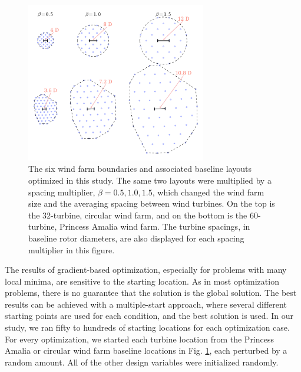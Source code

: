 \begin{figure}[htbp]
  \centering
  \includegraphics[width=0.7\textwidth]{Figures/spacing_multipliers.pdf}
  \caption{\label{farm_spacings}The six wind farm boundaries and associated baseline layouts optimized in this study. The same two layouts were multiplied by a spacing multiplier, $\beta=0.5,1.0,1.5$, which changed the wind farm size and the averaging spacing between wind turbines.  On the top is the 32-turbine, circular wind farm, and on the bottom is the 60-turbine, Princess Amalia wind farm. The turbine spacings, in baseline rotor diameters, are also displayed for each spacing multiplier in this figure.}
\end{figure}

The results of gradient-based optimization, especially for problems with many local minima, are sensitive to the starting location. As in most optimization problems, there is no guarantee that the solution is the global solution. The best results can be achieved with a multiple-start approach, where several different starting points are used for each condition, and the best solution is used. In our study, we ran fifty to hundreds of starting locations for each optimization case. For every optimization, we started each turbine location from the Princess Amalia or circular wind farm baseline locations in Fig. \ref{farm_spacings}, each perturbed by a random amount. All of the other design variables were initialized randomly.